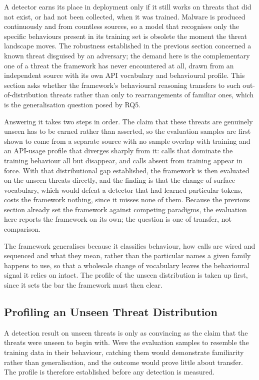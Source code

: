 \documentclass[%
    BCOR=10mm,
    DIV=13,
    toc=bibliography,
    toc=listof,
    oneside,
    12pt,
]{scrbook}
\begin{document}
A detector earns its place in deployment only if it still works on threats that
did not exist, or had not been collected, when it was trained. Malware is produced
continuously and from countless sources, so a model that recognises only the
specific behaviours present in its training set is obsolete the moment the threat
landscape moves. The robustness established in the previous section concerned a
known threat disguised by an adversary; the demand here is the complementary one of
a threat the framework has never encountered at all, drawn from an independent
source with its own API vocabulary and behavioural profile. This section asks
whether the framework's behavioural reasoning transfers to such out-of-distribution
threats rather than only to rearrangements of familiar ones, which is the
generalisation question posed by RQ5.

Answering it takes two steps in order. The claim that these threats are genuinely
unseen has to be earned rather than asserted, so the evaluation samples are first
shown to come from a separate source with no sample overlap with training and
an API-usage profile that diverges sharply from it: calls that dominate the
training behaviour all but disappear, and calls absent from training appear in
force. With that distributional gap established, the framework is then evaluated on
the unseen threats directly, and the finding is that the change of surface
vocabulary, which would defeat a detector that had learned particular tokens, costs
the framework nothing, since it misses none of them. Because the previous section
already set the framework against competing paradigms, the evaluation here reports
the framework on its own; the question is one of transfer, not comparison.

The framework generalises because it classifies behaviour, how calls are wired
and sequenced and what they mean, rather than the particular names a given
family happens to use, so that a wholesale change of vocabulary leaves the
behavioural signal it relies on intact. The profile of the unseen distribution
is taken up first, since it sets the bar the framework must then clear.

\subsection{Profiling an Unseen Threat Distribution}
\label{subsec:lofo_results}

A detection result on unseen threats is only as convincing as the claim that the
threats were unseen to begin with. Were the evaluation samples to resemble the
training data in their behaviour, catching them would demonstrate familiarity
rather than generalisation, and the outcome would prove little about transfer. The
profile is therefore established before any detection is measured.
\end{document}

